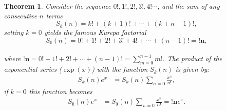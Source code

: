 \documentclass[pdflatex,sn-mathphys-num]{sn-jnl}%
\newtheorem{theorem}{Theorem}
\theoremstyle{thmstyleone}%
\theoremstyle{thmstyletwo}%
\theoremstyle{thmstylethree}%
\begin{document}
\begin{theorem}\label{Add}\cite{kurepa1971left}
 Consider the sequence $0!, 1!, 2!, 3!, 4!\cdots$, and the sum of any consecutive $n$ terms $$S_k(n)= k!+(k+1)!+ \cdots+(k+n-1)!,$$
    setting $k=0$ yields the famous Kurepa factorial
    $$S_0(n)= 0!+1!+ 2! +3!+ 4! +\cdots+(n-1)!=\mathbf{!n},$$ \\where $\mathbf{!n} = 0! +1! + 2! +\cdots +(n-1)! = \sum_{m=0}^{n-1} m!$.
    The product of the exponential series ($\exp{(x)}$) with the function $S_k(n)$ is given by:
\begin{align*}
S_k(n)e^x &= S_k(n)\sum_{n=0}\frac{x^n}{n!},
\end{align*}
if $k=0$ this function becomes 
\begin{align*}
S_0(n)e^x &= S_0(n)\sum_{n=0}\frac{x^n}{n!}=\mathbf{!n}e^x.
\end{align*}  
\end{theorem}
\end{document}
